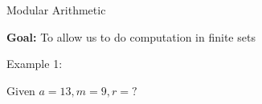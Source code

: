\documentclass{article}
\begin{document}
\thispagestyle{empty}
\begin{landscape}
\begin{center}


\begin{center}
\Huge{Modular Arithmetic}
\end{center}

\vspace{0.3cm}

\textbf{Goal:} To allow us to do computation in finite sets \\


\vspace{0.5cm}

\begin{center}

\end{center}

Example 1:

Given $a = 13, m = 9, r = ?$
\end{center}
\end{landscape}
\end{document}
